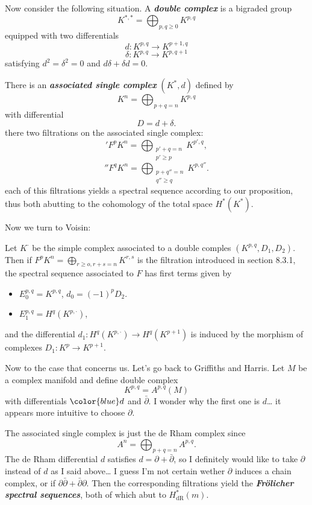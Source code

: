 \begin{remark}
\begin{defn}
{\color{cyan}Now consider the following situation.} A \textit{\textbf{double complex}} is a bigraded group
\[K^{*,*}=\bigoplus_{p,q\geq 0}  K^{p,q}\]
equipped with two differentials
\[d:K^{p,q}\to K^{p+1,q}\]
\[\delta:K^{p,q}\to K^{p,q+1}\]
satisfying $d^2=\delta^2=0$ and $d\delta +\delta d=0$.

There is an \textit{\textbf{associated single complex}} $(K^*,d)$ defined by
\[K^n=\bigoplus_{p+q=n} K^{p,q} \]
with differential
\[D=d+\delta.\]
there two filtrations on the associated single complex:
\['F^pK^n=\bigoplus_{\substack{p'+q=n\\p'\geq p}}K^{p',q},\]
	\[''F^qK^n=\bigoplus_{\substack{p+q''=n\\q''\geq q}}K^{p,q''}.\]
each of this filtrations yields a spectral sequence according to our proposition, thus both abutting to the cohomology of the total space $H^{*}(K^*)$.

Now we turn to Voisin:

\begin{prop}[Voisin, 8.25]
	Let $K^\cdot$ be the simple complex associated to a double comples $(K^{p,q},D_1,D_2)$. Then if $F^pK^n=\bigoplus_{r\geq o,r+s=n} K^{r,s}$ is the filtration introduced in section 8.3.1, the spectral sequence associated to $F$ has first terms given by
	\begin{itemize}
		\item $E^{p,q}_0=K^{p,q}$, $d_0=(-1)^pD_2$.
		\item $E^{p,q}_1=H^{q}(K^{p,\cdot})$,
	\end{itemize}
	and the differential $d_1:H^{q}(K^{p,\cdot })\to H^{q}(K^{p+1})$ is induced by the morphism of complexes $D_1:K^p\to K^{p+1}$. 

\end{prop}

{\color{cyan}Now to the case that concerns us. Let's go back to Griffiths and Harris.} Let $M$ be a complex manifold and define double complex
\[K^{p,q}=A^{p,q}(M)\]
with differentials ${\color{blue}d}$ and $\bar\partial$. {\color{blue}I wonder why the first one is $ d$… it appears more intuitive to choose $\partial$.}

The associated single complex is just the de Rham complex since
\[A^{n}=\bigoplus_{p+q=n} A^{p,q}.\]
{\color{blue}The de Rham differential $d$ satisfies $d=\partial+\bar\partial$, so I definitely would like to take $\partial$ instead of $d$ as I said above… I guess I'm not certain wether $\partial$ induces a chain complex, or if $\partial\bar\partial+\bar\partial\partial$}. Then the corresponding filtrations yield the \textit{\textbf{Fr\"olicher spectral sequences}}, both of which abut to $H^{*}_{\operatorname{dR}}(m)$.


\end{defn}
\end{remark}
